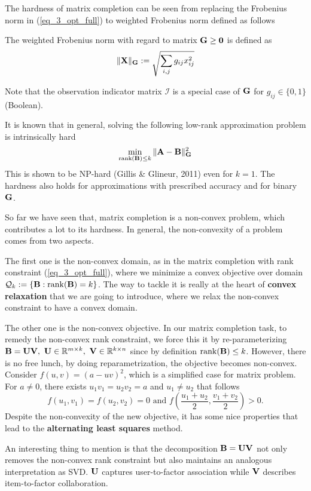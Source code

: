 \documentclass[../book-template.tex]{subfiles}
\begin{document}
\par The hardness of matrix completion can be seen from replacing the Frobenius norm in (\ref{eq_3_opt_full}) to weighted Frobenius norm defined as follows
\begin{definition}\label{def_3_wtd_f_norm}
	The weighted Frobenius norm with regard to matrix ${\bf G}\geq {\bf 0}$ is defined as
	\begin{equation*}
	\|{\bf X}\|_{{\bf G}}:=\sqrt{\sum_{i,j}g_{ij}x_{ij}^2}
	\end{equation*}
\end{definition}
Note that the observation indicator matrix $\mathcal{I}$ is a special case of ${\bf G}$ for $g_{ij}\in\{0,1\}$ (Boolean).
\par It is known that in general, solving the following low-rank approximation problem is intrinsically hard
\begin{equation*}
	\min_{\operatorname{rank}({\bf B})\leq k} \|{\bf A}-{\bf B}\|_{{\bf G}}^2
\end{equation*}
This is shown to be NP-hard (Gillis \& Glineur, 2011) even for $k=1$. The hardness also holds for approximations with prescribed accuracy and for binary ${\bf G}$.
\par So far we have seen that, matrix completion is a non-convex problem, which contributes a lot to its hardness. In general, the non-convexity of a problem comes from two aspects. 
\par The first one is the non-convex domain, as in the matrix completion with rank constraint (\ref{eq_3_opt_full}), where we minimize a convex objective over domain $\mathcal{Q}_k:=\{{\bf B}:\operatorname{rank}({\bf B})=k\}$. The way to tackle it is really at the heart of \textbf{convex relaxation} that we are going to introduce, where we relax the non-convex constraint to have a convex domain.
\par The other one is the non-convex objective. In our matrix completion task, to remedy the non-convex rank constraint, we force this it by re-parameterizing ${\bf B}={\bf UV},\ {\bf U}\in \mathbb{R}^{m\times k},\ {\bf V}\in \mathbb{R}^{k\times n}$ since by definition $\operatorname{rank}({\bf B})\leq k$. However, there is no free lunch, by doing reparametrization, the objective becomes non-convex. Consider $f(u, v) = (a-uv)^2$, which is a simplified case for matrix problem. For $a\neq 0$, there exists $u_1v_1=u_2v_2=a$ and $u_1\neq u_2$ that follows
\begin{equation*}
	f(u_1,v_1)=f(u_2,v_2)=0 \text{ and } f(\frac{u_1+u_2}{2},\frac{v_1+v_2}{2})>0.
\end{equation*}
Despite the non-convexity of the new objective, it has some nice properties that lead to the \textbf{alternating least squares} method.
\begin{remark}
	An interesting thing to mention is that the decomposition ${\bf B} = {\bf UV}$ not only removes the non-convex rank constraint but also maintains an analogous interpretation as SVD. ${\bf U}$ captures user-to-factor association while ${\bf V}$ describes item-to-factor collaboration.
\end{remark}
\end{document}
